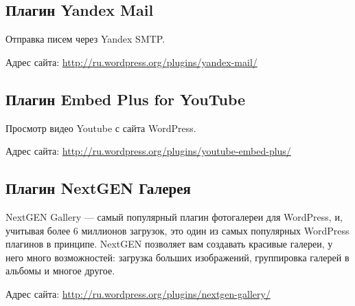 \subsection{Плагин Yandex Mail}
\label{sec:plugin_yandex_mail}

Отправка писем через Yandex SMTP.

Адрес сайта: \url{http://ru.wordpress.org/plugins/yandex-mail/}

\subsection{Плагин Embed Plus for YouTube}
\label{sec:plugin_youtube}

Просмотр видео Youtube с сайта WordPress.

Адрес сайта: \url{http://ru.wordpress.org/plugins/youtube-embed-plus/}

\subsection{Плагин NextGEN Галерея}
\label{sec:plugin_NextGEN}

NextGEN Gallery — самый популярный плагин фотогалереи для WordPress, и, учитывая более 6 миллионов загрузок, это один из самых популярных WordPress плагинов в принципе. NextGEN позволяет вам создавать красивые галереи, у него много возможностей: загрузка больших изображений, группировка галерей в альбомы и многое другое.

Адрес сайта: \url{http://ru.wordpress.org/plugins/nextgen-gallery/}